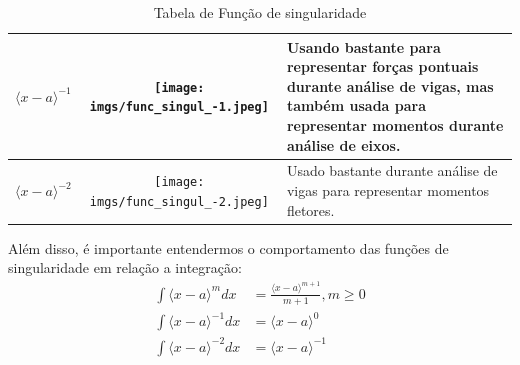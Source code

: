 \documentclass{article}
\begin{document}
\begin{table}[h]
\begin{tabular}{|c|c|l|}
        $\langle x - a\rangle^{-1}$                                    &
        \begin{minipage}{.3\textwidth}
            \centering
            \texttt{[image: imgs/func\_singul\_-1.jpeg]}
        \end{minipage} &
        \begin{minipage}{.4\textwidth}
            Usando bastante para representar forças pontuais durante análise de vigas, mas também usada para representar momentos durante análise de eixos.
        \end{minipage}                     \\ \hline

        $\langle x - a\rangle^{-2}$                                    &
        \begin{minipage}{.3\textwidth}
            \centering
            \texttt{[image: imgs/func\_singul\_-2.jpeg]}
        \end{minipage} &
        \begin{minipage}{.4\textwidth}
            Usado bastante durante análise de vigas para representar momentos fletores.
        \end{minipage}                                                                                         \\ \hline
    \end{tabular}
    \caption{Tabela de Função de singularidade}
    \label{tb:tab_func_sing}
\end{table}

Além disso, é importante entendermos o comportamento das funções de singularidade em relação a integração:
\begin{align*}
    \int \langle x-a\rangle^m dx    & = \frac{\langle x - a \rangle ^{m+1}}{m + 1}, m \ge 0 \\
    \int \langle x-a\rangle^{-1} dx & = \langle x - a \rangle^0                             \\
    \int \langle x-a\rangle^{-2} dx & = \langle x - a \rangle^{-1}                          \\
\end{align*}
\end{document}
